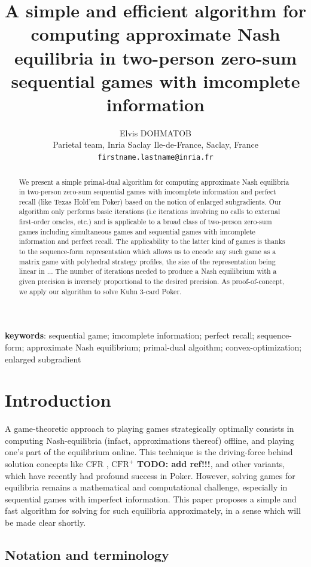 \documentclass{article} %
\title{
  A simple and efficient algorithm for computing approximate
  Nash equilibria in two-person zero-sum sequential games with imcomplete
  information}
\author{Elvis DOHMATOB
\\Parietal team, Inria Saclay Ile-de-France, Saclay, France
\\\texttt{firstname.lastname@inria.fr}
}
\begin{document}
\maketitle
\begin{abstract}We present a simple primal-dual algorithm for
  computing approximate Nash equilibria in two-person zero-sum
  sequential games with  imcomplete information and perfect recall
  (like Texas Hold'em Poker) based on the notion of enlarged
  subgradients. Our algorithm only performs basic iterations (i.e
  iterations involving no calls to external first-order oracles, etc.)
  and is applicable to a broad class of two-person zero-sum games
  including simultaneous games and sequential games with imcomplete
  information and perfect recall. The applicability to the latter kind
  of games is thanks to the sequence-form representation
  \cite{koller1992complexity} which allows us to encode any such game
  as a matrix game with polyhedral strategy profiles, the size of the
  representation being linear in ... The number of iterations needed
  to produce a Nash equilibrium with a given precision is inversely
  proportional to the desired precision. As proof-of-concept, we apply our
  algorithm to solve Kuhn 3-card Poker.
\end{abstract}

\textbf{keywords}: sequential game; imcomplete information; perfect
recall; sequence-form; approximate Nash equilibrium; primal-dual
algoithm; convex-optimization; enlarged subgradient

\section{Introduction}
\label{sec:intro}
A game-theoretic approach to playing games strategically optimally
consists in computing Nash-equilibria (infact, approximations thereof)
offline, and playing one's part of the equilibrium online. This
technique is the driving-force behind solution concepts like CFR
\cite{zinkevich2008regret,lanctot2009monte},
$\text{CFR}^{+}$ \textbf{TODO: add ref!!!}, and other variants, which
have recently had profound success in Poker. However, solving games
for equilibria remains a mathematical and computational challenge,
especially in sequential games with imperfect information. This paper
proposes a simple and fast algorithm for solving for such equilibria
approximately, in a sense which will be made clear shortly.

\subsection{Notation and terminology}
\end{document}
